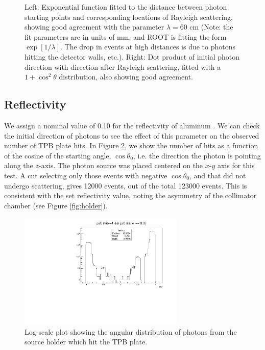\documentclass[aps,pra,notitlepage,groupedaddress]{revtex4-1}
\begin{document}
\begin{figure}
\begin{minipage}{0.49\textwidth}
	\end{minipage}
	\caption{Left: Exponential function fitted to the distance between photon starting points and corresponding locations of Rayleigh scattering, showing good agreement with the parameter $\lambda = 60$ cm (Note: the fit parameters are in units of mm, and ROOT is fitting the form $\exp[1/\lambda]$. The drop in events at high distances is due to photons hitting the detector walls, etc.). Right: Dot product of initial photon direction with direction after Rayleigh scattering, fitted with a $1+\cos^2\theta$ distribution, also showing good agreement. \label{fig:rayleigh}}
\end{figure}

\subsection{Reflectivity}

We assign a nominal value of 0.10 for the reflectivity of aluminum \cite{johnson_1968}. We can check the initial direction of photons to see the effect of this parameter on the observed number of TPB plate hits. In Figure \ref{fig:reflect}, we show the number of hits as a function of the cosine of the starting angle, $\cos \theta_0$, i.e. the direction the photon is pointing along the $z$-axis. The photon source was placed centered on the $x$-$y$ axis for this test. A cut selecting only those events with negative $\cos \theta_0$, and that did not undergo scattering, gives 12000 events, out of the total 123000 events. This is consistent with the set reflectivity value, noting the asymmetry of the collimator chamber (see Figure \ref{fig:holder}).

\begin{figure}
	\begin{center}
		\includegraphics[width=0.7\textwidth]{figures/reflect}
	\end{center}
	\caption{Log-scale plot showing the angular distribution of photons from the source holder which hit the TPB plate.\label{fig:reflect}}
\end{figure}
\end{document}
